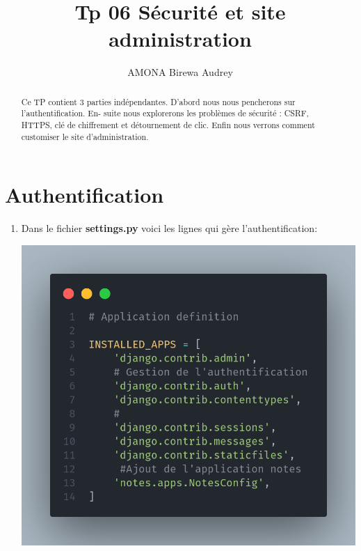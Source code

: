 \documentclass[11pt,a4paper]{article}
\author{AMONA Birewa Audrey}
\title{ Tp 06 Sécurité et site administration }
\begin{document}
\maketitle
\tableofcontents
\begin{abstract}
Ce TP contient 3 parties indépendantes. D’abord nous nous pencherons sur l’authentification. En-
suite nous explorerons les problèmes de sécurité : CSRF, HTTPS, clé de chiffrement et détournement
de clic. Enfin nous verrons comment customiser le site d’administration.
\end{abstract}
\section{Authentification}
\begin{enumerate}
\item Dans le fichier \textbf{settings.py}  voici les lignes qui gère l'authentification:
\begin{center}
\includegraphics[scale=0.2]{images/setauth.png} 
\end{center}


\end{enumerate}
\end{document}
